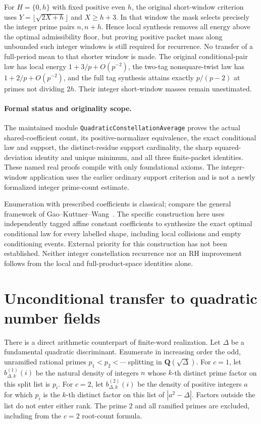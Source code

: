 \documentclass[11pt]{article}
\begin{document}
For \(H=\{0,h\}\) with fixed positive even \(h\), the original
short-window criterion uses \(Y=\lfloor\sqrt{2X+h}\rfloor\) and
\(X\geq h+3\). In that window the mask selects precisely the integer
prime pairs \(n,n+h\). Hence local synthesis removes all energy above
the optimal admissibility floor, but proving positive packet mass
along unbounded such integer windows is still required for recurrence.
No transfer of a full-period mean to that shorter window is made.
The original conditional-pair law has local energy \(1+3/p+O(p^{-2})\),
the two-tag nonsquare-twist law has \(1+2/p+O(p^{-2})\), and the full
tag synthesis attains exactly \(p/(p-2)\) at primes not dividing \(2h\).
Their integer short-window masses remain unestimated.

\paragraph{Formal status and originality scope.}
The maintained module \texttt{QuadraticConstellationAverage} proves
the actual shared-coefficient count, its positive-normalizer equivalence,
the exact conditional law and support, the distinct-residue support
cardinality, the sharp squared-deviation identity and unique minimum,
and all three finite-packet identities. These named real proofs compile
with only foundational axioms. The integer-window application uses the
earlier ordinary support criterion and is not a newly formalized
integer prime-count estimate.

Enumeration with prescribed coefficients is classical; compare the
general framework of Gao--Kuttner--Wang~\cite{GaoKuttnerWang}.
The specific construction here uses independently tagged affine constant
coefficients to synthesize the exact optimal conditional law for every
labelled shape, including local collisions and empty conditioning events.
External priority for this construction has not been established.
Neither integer constellation recurrence nor an RH improvement follows
from the local and full-product-space identities alone.

\section{Unconditional transfer to quadratic number fields}

There is a direct arithmetic counterpart of finite-word realization.
Let \(\Delta\) be a fundamental quadratic discriminant. Enumerate in
increasing order the odd, unramified rational primes
\(p_1<p_2<\cdots\) splitting in \(\mathbf Q(\sqrt\Delta)\).
For \(c=1\), let \(b_{\Delta,k}^{(1)}(i)\) be the natural density of
integers \(n\) whose \(k\)-th distinct prime factor on this split list
is \(p_i\). For \(c=2\), let \(b_{\Delta,k}^{(2)}(i)\) be the density
of positive integers \(a\) for which \(p_i\) is the \(k\)-th distinct
factor on this list of \(|a^2-\Delta|\). Factors outside the list
do not enter either rank. The prime \(2\) and all ramified primes
are excluded, including from the \(c=2\) root-count formula.
\end{document}
